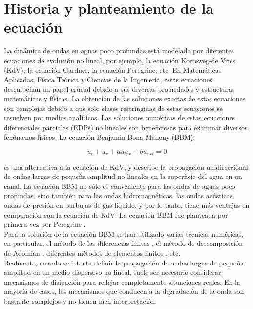 
\chapter{Historia y planteamiento de la ecuación}

La dinámica de ondas en aguas poco profundas está modelada por diferentes ecuaciones de evolución no lineal, por ejemplo, la  ecuación Korteweg-de Vries (KdV), la  ecuación Gardner, la  ecuación Peregrine, etc. En Matemáticas Aplicadas, Física Teórica y Ciencias de la Ingeniería, estas ecuaciones desempeñan un papel crucial debido a sus diversas propiedades y estructuras matemáticas y físicas.
La obtención de las soluciones exactas de estas ecuaciones son complejas debido a que solo clases restringidas de estas ecuaciones se resuelven por medios analíticos. Las soluciones numéricas de estas ecuaciones diferenciales parciales (EDPs) no lineales son beneficiosas para examinar diversos fenómenos físicos. La ecuación Benjamin-Bona-Mahony (BBM):

$$u_{t}+u_{x}+auu_{x}-bu_{xxt}=0$$

es una alternativa a la ecuación de KdV, y describe la propagación unidireccional de ondas largas de pequeña amplitud no lineales en la superficie del agua en un canal. La ecuación BBM no sólo es conveniente para las ondas de aguas poco profundas, sino también para las ondas hidromagnéticas, las ondas acústicas, ondas de presión en burbujas de gas-líquido, y por lo tanto, tiene más ventajas en comparación con la ecuación de KdV. La ecuación BBM fue planteada por primera vez por Peregrine  \cite{peregrine1}. \\

Para la solución de la ecuación BBM se han utilizado varias técnicas numéricas, en particular, el método de las diferencias finitas \cite{ej3}, el método de descomposición de Adomian \cite{ej4}, diferentes métodos de elementos finitos \cite{ej1,ej2} , etc.\\


Realmente, cuando se intenta definir la propagación de ondas largas de pequeña amplitud en un medio dispersivo no lineal, suele ser necesario considerar mecanismos de disipación para reflejar completamente situaciones reales. En la mayoría de casos, los mecanismos que conducen
a la degradación de la onda son bastante complejos y no tienen fácil interpretación.\\


